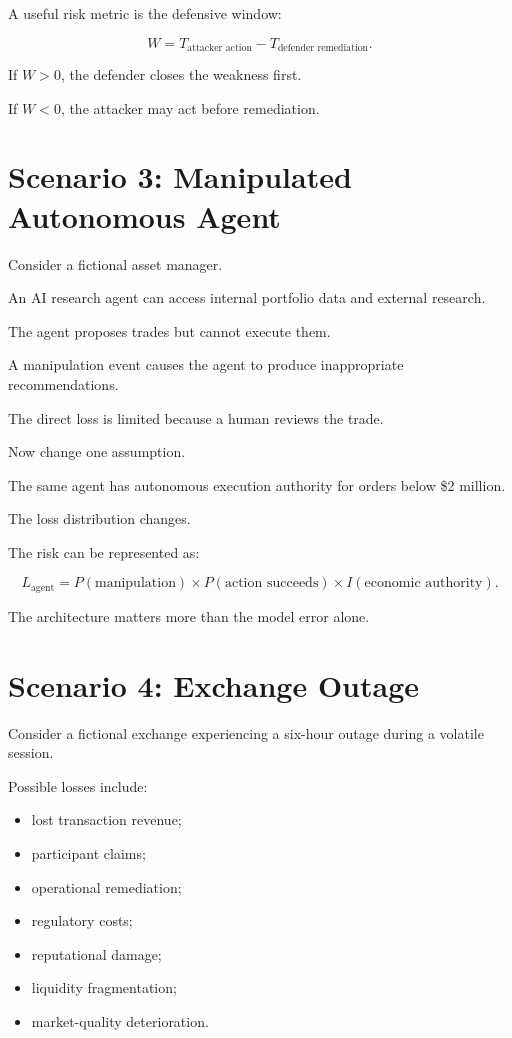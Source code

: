 A useful risk metric is the defensive window:

\begin{equation}
W =
T_{\text{attacker action}}
-
T_{\text{defender remediation}}.
\end{equation}

If \(W > 0\), the defender closes the weakness first.

If \(W < 0\), the attacker may act before remediation.

\section{Scenario 3: Manipulated Autonomous Agent}

Consider a fictional asset manager.

An AI research agent can access internal portfolio data and external research.

The agent proposes trades but cannot execute them.

A manipulation event causes the agent to produce inappropriate recommendations.

The direct loss is limited because a human reviews the trade.

Now change one assumption.

The same agent has autonomous execution authority for orders below \$2 million.

The loss distribution changes.

The risk can be represented as:

\begin{equation}
L_{\text{agent}}
=
P(\text{manipulation})
\times
P(\text{action succeeds})
\times
I(\text{economic authority}).
\end{equation}

The architecture matters more than the model error alone.

\section{Scenario 4: Exchange Outage}

Consider a fictional exchange experiencing a six-hour outage during a volatile session.

Possible losses include:

\begin{itemize}
    \item lost transaction revenue;
    \item participant claims;
    \item operational remediation;
    \item regulatory costs;
    \item reputational damage;
    \item liquidity fragmentation;
    \item market-quality deterioration.
\end{itemize}

